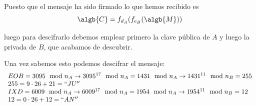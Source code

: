 \begin{problem}[4]
Puesto que el mensaje ha sido firmado lo que hemos recibido es
\[\algb{C}=f_{d_A}(f_{e_B}(\algb{M}))\]

luego para descifrarlo debemos emplear primero la clave pública de $A$ y luego la privada de $B$, que acabamos de descubrir.

Una vez sabemos esto podemos descifrar el mensaje:
\[\begin{array}{l}
EOB = 3095 \mod n_A \to 3095^{17} \mod n_A = 1431 \mod n_A \to 1431^{11} \mod n_B = 255\\
255 = 9 \cdot 26 + 21 = ``JU''\\
IXD = 6009 \mod n_A \to 6009^{17} \mod n_A = 1954 \mod n_A \to 1954^{11} \mod n_B = 12\\
12 = 0 \cdot 26 + 12 = ``AN''
\end{array}\]


\end{problem}


